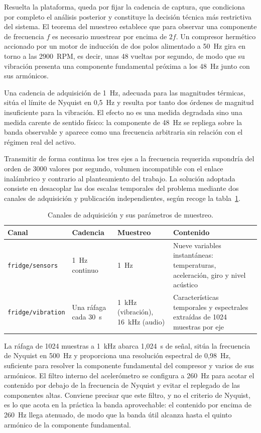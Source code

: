 Resuelta la plataforma, queda por fijar la cadencia de captura, que condiciona por completo el
análisis posterior y constituye la decisión técnica más restrictiva del sistema. El teorema del
muestreo establece
que para observar una componente de frecuencia $f$ es necesario muestrear por encima de
$2f$. Un compresor hermético accionado por un motor de inducción de dos polos alimentado a
\mbox{50 Hz} gira en torno a las \mbox{2900 RPM}, es decir, unas 48 vueltas por segundo, de
modo que su vibración presenta una componente fundamental próxima a los \mbox{48 Hz} junto
con sus armónicos.

Una cadencia de adquisición de \mbox{1 Hz}, adecuada para las magnitudes térmicas, sitúa el
límite de Nyquist en \mbox{0,5 Hz} y resulta por tanto dos órdenes de magnitud insuficiente
para la vibración. El efecto no es una medida degradada sino una medida carente de sentido
físico: la componente de \mbox{48 Hz} se repliega sobre la banda observable y aparece como
una frecuencia arbitraria sin relación con el régimen real del activo.

Transmitir de forma continua los tres ejes a la frecuencia requerida supondría del orden de
3000 valores por segundo, volumen incompatible con el enlace inalámbrico y contrario al
planteamiento del trabajo. La solución adoptada consiste en desacoplar las dos escalas
temporales del problema mediante dos canales de adquisición y publicación independientes,
según recoge la tabla~\ref{table:muestreo}.

\begin{table}[ht!]
\caption{Canales de adquisición y sus parámetros de muestreo.}
\label{table:muestreo}
\centering
\begin{tabular}{|p{3.1cm}|p{2.2cm}|p{2.2cm}|p{4.6cm}|}
\hline
\textbf{Canal} & \textbf{Cadencia} & \textbf{Muestreo} & \textbf{Contenido} \\
\hline
\texttt{fridge/sensors} & \mbox{1 Hz} continuo & \mbox{1 Hz} & Nueve variables
instantáneas: temperaturas, aceleración, giro y nivel acústico \\
\hline
\texttt{fridge/vibration} & Una ráfaga cada \mbox{30 s} & \mbox{1 kHz} (vibración),
\mbox{16 kHz} (audio) & Características temporales y espectrales extraídas de 1024
muestras por eje \\
\hline
\end{tabular}
\end{table}

La ráfaga de 1024 muestras a \mbox{1 kHz} abarca \mbox{1,024 s} de señal, sitúa la
frecuencia de Nyquist en \mbox{500 Hz} y proporciona una resolución espectral de
\mbox{0,98 Hz}, suficiente para resolver la componente fundamental del compresor y varios
de sus armónicos. El filtro interno del acelerómetro se configura a \mbox{260 Hz} para
acotar el contenido por debajo de la frecuencia de Nyquist y evitar el replegado de las
componentes altas. Conviene precisar que este filtro, y no el criterio de Nyquist, es lo que
acota en la práctica la banda aprovechable: el contenido por encima de \mbox{260 Hz} llega
atenuado, de modo que la banda útil alcanza hasta el quinto armónico de la componente
fundamental.

